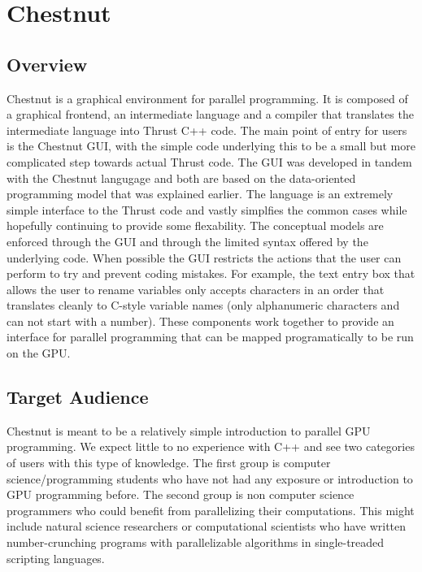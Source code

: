 \documentclass[twocolumn]{article}
\renewcommand{\|}{\origbar} %
\begin{document}
\section{Chestnut}
\label{sec:chestnut}

\subsection{Overview}

Chestnut is a graphical environment for parallel programming. It is composed of a graphical frontend, an intermediate language and a compiler that translates the intermediate language into Thrust C++ code. The main point of entry for users is the Chestnut GUI, with the simple code underlying this to be a small but more complicated step towards actual Thrust code. The GUI was developed in tandem with the Chestnut langugage and both are based on the data-oriented programming model that was explained earlier. The language is an extremely simple interface to the Thrust code and vastly simplfies the common cases while hopefully continuing to provide some flexability. The conceptual models are enforced through the GUI and through the limited syntax offered by the underlying code. When possible the GUI restricts the actions that the user can perform to try and prevent coding mistakes. For example, the text entry box that allows the user to rename variables only accepts characters in an order that translates cleanly to C-style variable names (only alphanumeric characters and can not start with a number). These components work together to provide an interface for parallel programming that can be mapped programatically to be run on the GPU.

\subsection{Target Audience}
\label{sec:targetaudience}

Chestnut is meant to be a relatively simple introduction to parallel GPU programming. We expect little to no experience with C++ and see two categories of users with this type of knowledge. The first group is computer science/programming students who have not had any exposure or introduction to GPU programming before. The second group is non computer science programmers who could benefit from parallelizing their computations. This might include natural science researchers or computational scientists who have written number-crunching programs with parallelizable algorithms in single-treaded scripting languages.
\end{document}
